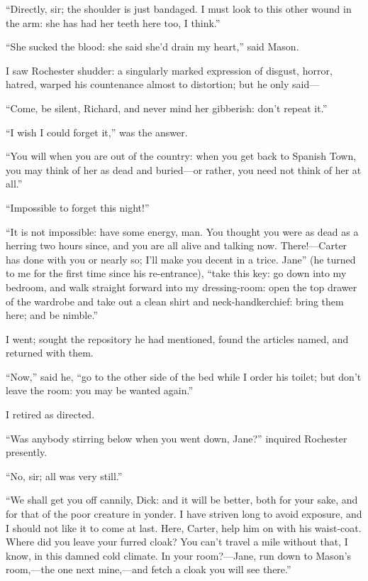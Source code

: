 \enquote{Directly, sir; the shoulder is just bandaged. I must look to
	this other wound in the arm: she has had her teeth here too, I think.}

\enquote{She sucked the blood: she said she'd drain my heart,} said
Mason.

I saw \Mr{} Rochester shudder: a singularly marked expression of disgust,
horror, hatred, warped his countenance almost to distortion; but he only
said---

\enquote{Come, be silent, Richard, and never mind her gibberish: don't
	repeat it.}

\enquote{I wish I could forget it,} was the answer.

\enquote{You will when you are out of the country: when you get back to
	Spanish Town, you may think of her as dead and buried---or rather, you
	need not think of her at all.}

\enquote{Impossible to forget this night!}

\enquote{It is not impossible: have some energy, man. You thought you
	were as dead as a herring two hours since, and you are all alive and
	talking now. There!---Carter has done with you or nearly so; I'll make
	you decent in a trice. Jane} (he turned to me for the first time since
his re-entrance), \enquote{take this key: go down into my bedroom, and
	walk straight forward into my dressing-room: open the top drawer of the
	wardrobe and take out a clean shirt and neck-handkerchief: bring them
	here; and be nimble.}

I went; sought the repository he had mentioned, found the articles
named, and returned with them.

\enquote{Now,} said he, \enquote{go to the other side of the bed while I
	order his toilet; but don't leave the room: you may be wanted again.}

I retired as directed.

\enquote{Was anybody stirring below when you went down, Jane?} inquired
\Mr{} Rochester presently.

\enquote{No, sir; all was very still.}

\enquote{We shall get you off cannily, Dick: and it will be better, both
	for your sake, and for that of the poor creature in yonder. I have
	striven long to avoid exposure, and I should not like it to come at
	last. Here, Carter, help him on with his waist-coat. Where did you
	leave your furred cloak? You can't travel a mile without that, I know,
	in this damned cold climate. In your room?---Jane, run down to \Mr{}
	Mason's room,---the one next mine,---and fetch a cloak you will see
	there.}

